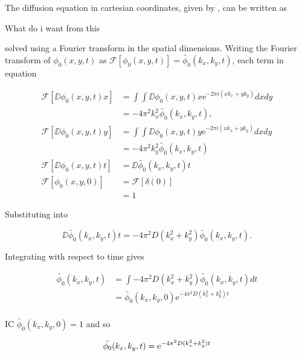 The diffusion equation in cartesian coordinates, given by , can be written as

{\huge What do i want from this}

 solved using a Fourier transform in the spatial dimensions. Writing the Fourier transform of $\phi_0(x,y,t)$ as $\mathscr{F}\left[ \phi_0(x,y,t) \right] = \tilde{\phi_0}(k_x,k_y,t)$, each term in equation

\begin{equation}
\begin{split}
  \mathscr{F}\left[ \DD{\phi_0(x,y,t)}{x} \right] &= \int \int \DD{\phi_0(x,y,t)}{x} \mathrm{e}^{-2\pi i(xk_x + yk_y)} dx dy \\
  &= -4\pi^2k_x^2 \tilde{\phi_0}(k_x,k_y,t), \\
  \mathscr{F}\left[ \DD{\phi_0(x,y,t)}{y} \right] &= \int \int \DD{\phi_0(x,y,t)}{y} \mathrm{e}^{-2\pi i(xk_x + yk_y)} dx dy \\
  &= -4\pi^2k_y^2 \tilde{\phi_0}(k_x,k_y,t) \\
  \mathscr{F}\left[\DD{\phi_0(x,y,t)}{t}\right] &= \DD{\tilde{\phi_0}(k_x,k_y,t)}{t} \\
  \mathscr{F}\left[\phi_0(x,y,0)\right] &= \mathscr{F}\left[\delta(0)\right] \\
  &= 1
\end{split}
\end{equation}


Substituting into 

\begin{equation}
  \DD{\tilde{\phi_0}(k_x,k_y,t)}{t} = -4\pi^2D (k_x^2 + k_y^2) \tilde{\phi_0}(k_x,k_y,t).
\end{equation}

Integrating with respect to time gives

\begin{equation}
\begin{split}
  \tilde{\phi_0}(k_x,k_y,t) &= \int -4\pi^2D (k_x^2 + k_y^2) \tilde{\phi_0}(k_x,k_y,t) dt \\
  &= \tilde{\phi_0}(k_x,k_y,0)\mathrm{e}^{-4\pi^2D(k_x^2 + k_y^2)t} \\
\end{split}
\end{equation}

IC $ \tilde{\phi_0}(k_x,k_y,0) = 1$ and so

\begin{equation}
  \tilde{\phi_0}(k_x,k_y,t) = \mathrm{e}^{-4\pi^2D(k_x^2 + k_y^2)t} \\
\end{equation}


